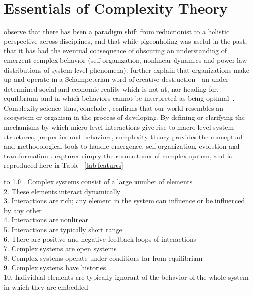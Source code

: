 \documentclass[12pt,letterpaper]{article}
\begin{document}
\section{Essentials of Complexity Theory}\label{S:ComplexityTheory}
\cite{Eisenhardt2011} observe that there has been a paradigm shift from reductionist to a holistic perspective across disciplines, and that while pigeonholing was useful in the past, that it has had the eventual consequence of obscuring an understanding of emergent complex behavior (self-organization, nonlinear dynamics and power-law distributions of system-level phenomena). \cite{Maguire2011} further explain that organizations make up and operate in a Schumpeterian word of creative destruction - an under-determined social and economic reality which is not at, nor heading for, \textquotesingle equilibrium\textquotesingle \ and in which behaviors cannot be interpreted as being \textquotesingle optimal\textquotesingle\ .  Complexity science thus, conclude \cite{Maguire2011}, confirms that our world resembles an ecosystem or organism in the process of developing. By defining or clarifying the mechanisms by which micro-level interactions give rise to macro-level system structures, properties and behaviors, complexity theory provides the conceptual and methodological tools to handle emergence, self-organization, evolution and transformation \citep{Maguire2011}.  \cite{Cilliers1998} captures simply the cornerstones of complex system, and is reproduced here in Table ~\ref{tab:features}                                             
\setlength{\arrayrulewidth}{0.5mm}
\renewcommand{\arraystretch}{1.5}

\begin{table}[h!]
\begin{tabu} to 1.0\textwidth { |X[l]|} 
. Complex systems consist of a large number of elements\\
2. These elements interact dynamically\\
3.	Interactions are rich; any element in the system can influence or be influenced by any other\\
4.	Interactions are nonlinear\\
5.	Interactions are typically short range\\
6.	There are positive and negative feedback loops of interactions\\
7.	Complex systems are open systems\\
8.	Complex systems operate under conditions far from equilibrium\\
9.	Complex systems have histories\\
10.	Individual elements are typically ignorant of the behavior of the whole system in which they are embedded\\
\hline 
\end{tabu}
\caption{Features of Complex Systems, Adopted from \cite{Cilliers1998}}
\label{tab:features}
\end{table}
\end{document}
